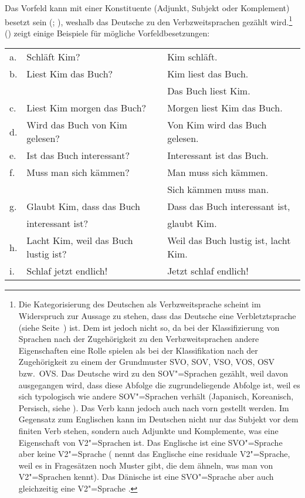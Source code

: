Das Vorfeld kann mit einer Konstituente (Adjunkt, Subjekt oder Komplement) besetzt sein (\citealp[Kapitel~2.4]{Erdmann1886a};
\citealp[, ]{Paul1919a}), weshalb das Deutsche zu den Verbzweitsprachen gezählt wird.\footnote{%
  Die Kategorisierung des Deutschen als Verbzweitsprache scheint im Widerspruch zur Aussage zu stehen, 
  dass das Deutsche eine Verbletztsprache (siehe Seite~\pageref{page-verbletzt}) ist. Dem ist
  jedoch nicht so, da bei der Klassifizierung von Sprachen nach der Zugehörigkeit zu den Verbzweitsprachen
  andere Eigenschaften eine Rolle spielen als bei der Klassifikation nach der Zugehörigkeit zu einem
  der Grundmuster SVO, SOV, VSO, VOS, OSV bzw.\ OVS. Das Deutsche wird zu den SOV"=Sprachen gezählt,
  weil davon ausgegangen wird, dass diese Abfolge die zugrundeliegende Abfolge ist, weil es sich
  typologisch wie andere SOV"=Sprachen verhält (Japanisch, Koreanisch, Persisch, siehe
  \citealt{Haider2020a}). Das Verb kann jedoch auch nach vorn gestellt werden. Im Gegensatz zum
  Englischen kann im Deutschen nicht nur das Subjekt vor dem finiten Verb stehen, sondern auch
  Adjunkte und Komplemente, was eine Eigenschaft von V2"=Sprachen ist. Das Englische ist eine
  SVO"=Sprache aber keine V2"=Sprache (\citet[]{Rizzi1990a-u} nennt das Englische eine
  residuale V2"=Sprache, weil es in Fragesätzen noch Muster gibt, die dem ähneln, was man von
  V2"=Sprachen kennt). Das Dänische ist eine SVO"=Sprache aber auch gleichzeitig eine V2"=Sprache
  \citep{Vikner95a-u,MOeDanish,MuellerGermanic}.%
}
() zeigt einige Beispiele für mögliche Vorfeldbesetzungen:
\ea
\label{fragen}
\begin{tabular}[t]{@{}l@{~}ll}
a. & Schläft Kim?                                       & Kim schläft.\\
b. & Liest Kim das Buch?                            & Kim liest das Buch.\\
   &                                                      & Das Buch liest Kim.\\
c. & Liest Kim morgen das Buch?                      & Morgen liest Kim das Buch.\\
d. & Wird das Buch von Kim gelesen?                    & Von Kim wird das Buch gelesen.\\
e. & Ist das Buch interessant?                           & Interessant ist das Buch.\\
f. & Muss man sich kämmen?                                & Man muss sich kämmen.\\
   &                                                      & Sich kämmen muss man.\\
g. & Glaubt Kim, dass das Buch         & Dass das Buch interessant ist, \\
   & interessant ist?                                            & glaubt Kim.\\
h. & Lacht Kim, weil das Buch lustig ist?              & Weil das Buch lustig ist, lacht Kim.\\
i. & Schlaf jetzt endlich!                                & Jetzt schlaf endlich!\\
\end{tabular}
\z



